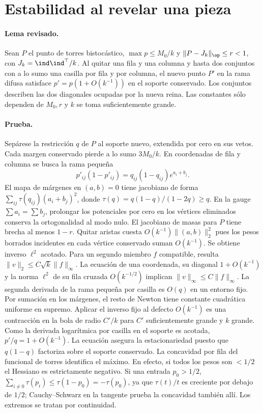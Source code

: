 \section{Estabilidad al revelar una pieza}
\paragraph{Lema revisado.}
Sean $P$ el punto de torres bistocástico, $\max p\le M_0/k$ y
$\|P-J_k\|_{\op}\le r<1$, con $J_k=\ind\ind^\top/k$. Al quitar una fila y una columna
y hasta dos conjuntos con a lo sumo una casilla por fila y por columna, el nuevo
punto $P'$ en la rama difusa satisface $p'=p(1+O(k^{-1}))$ en el soporte conservado.
Los conjuntos describen las dos diagonales ocupadas por la nueva reina.
Las constantes sólo dependen de $M_0,r$ y $k$ se toma suficientemente grande.
\paragraph{Prueba.}
Sepárese la restricción $q$ de $P$ al soporte nuevo, extendida por cero en sus vetos.
Cada margen conservado pierde a lo sumo $3M_0/k$. En coordenadas de fila y columna
se busca la rama pequeña
\[
 p'_{ij}(1-p'_{ij})=q_{ij}(1-q_{ij})e^{a_i+b_j}.
\]
El mapa de márgenes en $(a,b)=0$ tiene jacobiano de forma
$\sum_{ij}\tau(q_{ij})(a_i+b_j)^2$, donde $\tau(q)=q(1-q)/(1-2q)\ge q$.
En la gauge $\sum a_i=\sum b_j$, prolongar los potenciales por cero en los vértices
eliminados conserva la ortogonalidad al modo nulo. El jacobiano de masas para $P$ tiene
brecha al menos $1-r$. Quitar aristas cuesta $O(k^{-1})\|(a,b)\|_2^2$ pues los pesos
borrados incidentes en cada vértice conservado suman $O(k^{-1})$.
Se obtiene inverso $\ell^2$ acotado. Para un segundo miembro $f$ compatible, resulta
$\|v\|_2\le C\sqrt k\|f\|_\infty$. La ecuación de una coordenada, su diagonal
$1+O(k^{-1})$ y la norma $\ell^2$ de su fila cruzada $O(k^{-1/2})$ implican
$\|v\|_\infty\le C\|f\|_\infty$. La segunda derivada de la rama pequeña por casilla
es $O(q)$ en un entorno fijo. Por sumación en los márgenes, el resto de Newton tiene
constante cuadrática uniforme en supremo. Aplicar el inverso fijo al defecto $O(k^{-1})$
es una contracción en la bola de radio $C'/k$ para $C'$ suficientemente grande y $k$
grande. Como la derivada logarítmica por casilla en el soporte es acotada,
$p'/q=1+O(k^{-1})$. La ecuación asegura la estacionariedad puesto que $q(1-q)$
factoriza sobre el soporte conservado. La concavidad por fila del funcional de torres
identifica el máximo. En efecto, si todos los pesos son $<1/2$ el Hessiano es estrictamente
negativo. Si una entrada $p_0>1/2$, $\sum_{i\ne0}\tau(p_i)\le\tau(1-p_0)=-\tau(p_0)$,
ya que $\tau(t)/t$ es creciente por debajo de $1/2$; Cauchy--Schwarz en la tangente
prueba la concavidad también allí. Los extremos se tratan por continuidad.
